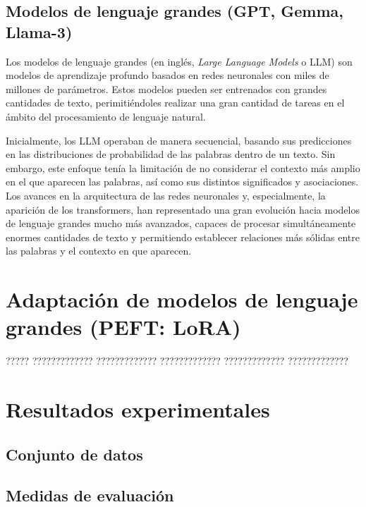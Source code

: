 \documentclass[11pt,spanish,listoffigures,listoftables]{tfgetsinf}
\begin{document}
\section{Modelos de lenguaje grandes (GPT, Gemma, Llama-3)}


Los modelos de lenguaje grandes (en inglés, \textit{Large Language Models} o LLM) son modelos de aprendizaje profundo basados en redes neuronales con miles de millones de parámetros. Estos modelos pueden ser entrenados con grandes cantidades de texto, perimitiéndoles realizar una gran cantidad de tareas en el ámbito del procesamiento de lenguaje natural.

Inicialmente, los LLM operaban de manera secuencial, basando sus predicciones en las distribuciones de probabilidad de las palabras dentro de un texto. Sin embargo, este enfoque tenía la limitación de no considerar el contexto más amplio en el que aparecen las palabras, así como sus distintos significados y asociaciones. Los  avances en la arquitectura de las redes neuronales y, especialmente, la aparición de los transformers, han representado una gran evolución hacia modelos de lenguaje grandes mucho más avanzados, capaces de procesar simultáneamente enormes cantidades de texto y permitiendo establecer relaciones más sólidas entre las palabras y el contexto en que aparecen.

\chapter{Adaptación de modelos de lenguaje grandes (PEFT: LoRA)}

????? ????????????? ????????????? ????????????? ????????????? ????????????? 

\chapter{Resultados experimentales}

\section{Conjunto de datos}

\section{Medidas de evaluación}
\end{document}
